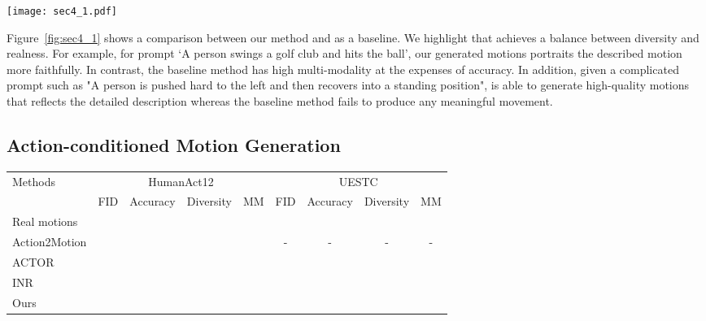 \begin{figure*}[t]
    \centering
    \texttt{[image: sec4\_1.pdf]}
    \caption{\textbf{Qualitative results on the HumanML3D dataset.} We compare our method with \cite{guo2022generating} and visualize two examples for each given prompt. \name is able to achieve both accuracy and diversity.}
    \label{fig:sec4_1}
\end{figure*}

Figure~\ref{fig:sec4_1} shows a comparison between our method and \cite{guo2022generating} as a baseline. We highlight that \name achieves a balance between diversity and realness. For example, for prompt `A person swings a golf club and hits the ball', our generated motions portraits the described motion more faithfully. In contrast, the baseline method has high multi-modality at the expenses of accuracy. In addition, given a complicated prompt such as "A person is pushed hard to the left and then recovers into a standing position", \name is able to generate high-quality motions that reflects the detailed description whereas the baseline method fails to produce any meaningful movement.

\subsection{Action-conditioned Motion Generation}\label{sec4_2}

\begin{table*}[ht]
\centering
\caption{\textbf{Quantitative results for Action-conditioned Motion Generation.} As for UESTC dataset, we report FID on the test split. MM: MultiModality.}
\label{tab:action}
\setlength{\tabcolsep}{1.4mm}
{
\begin{tabular}{lcccccccc}
\hline

\multirow{2}{2cm}{\centering Methods} & \multicolumn{4}{c}{\centering HumanAct12} & \multicolumn{4}{c}{\centering UESTC} \\

& FID & Accuracy & Diversity &  MM & FID & Accuracy &  Diversity &  MM \\

\hline
Real motions &  &  &  &  &  &  &  & \\ 
\hline
Action2Motion &  &  &  &  & - & - & - & - \\
ACTOR &  &  &  &  &  &  &  &  \\
INR &  &  &  &  &  &  &  &  \\

\hline
Ours &  &  &  &  &  &  &  &  \\
\hline
\end{tabular}}
\end{table*}

